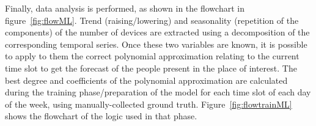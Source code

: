 Finally, data analysis is performed, as shown in the flowchart in figure~\ref{fig:flowML}. Trend (raising/lowering) and seasonality (repetition of the components) of the number of devices are extracted using a decomposition of the corresponding temporal series. Once these two variables are known, it is possible to apply to them the correct polynomial approximation relating to the current time slot to get the forecast of the people present in the place of interest. The best degree and coefficients of the polynomial approximation are calculated during the training phase/preparation of the model for each time slot of each day of the week, using manually-collected ground truth. Figure~\ref{fig:flowtrainML} shows the flowchart of the logic used in that phase.



